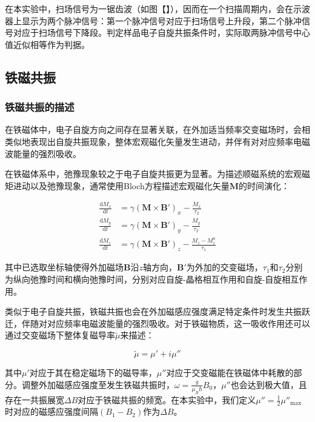 \documentclass{thuemp}
\begin{document}
在本实验中，扫场信号为一锯齿波（如图【】），因而在一个扫描周期内，会在示波器上显示为两个脉冲信号：第一个脉冲信号对应于扫场信号上升段，第二个脉冲信号对应于扫场信号下降段。判定样品电子自旋共振条件时，实际取两脉冲信号中心值近似相等作为判据。

\subsection{铁磁共振}

\subsubsection{铁磁共振的描述}

在铁磁体中，电子自旋方向之间存在显著关联，在外加适当频率交变磁场时，会相类似地表现出自旋共振现象，整体宏观磁化矢量发生进动，并伴有对对应频率电磁波能量的强烈吸收。

在铁磁体系中，弛豫现象较之于电子自旋共振更为显著。为描述顺磁系统的宏观磁矩进动以及弛豫现象，通常使用Bloch方程描述宏观磁化矢量$\symbf{M}$的时间演化：

\begin{equation}
\begin{aligned}
    \frac{\mathrm{d} M_x}{\mathrm{d} t} &= \gamma (\symbf{M} \times \symbf{B'})_x - \frac{M_x}{\tau_2} \\
    \frac{\mathrm{d} M_y}{\mathrm{d} t} &= \gamma (\symbf{M} \times \symbf{B'})_y - \frac{M_y}{\tau_2} \\
    \frac{\mathrm{d} M_z}{\mathrm{d} t} &= \gamma (\symbf{M} \times \symbf{B'})_z - \frac{M_z - M_z^0}{\tau_1}
\end{aligned}
\end{equation}

其中已选取坐标轴使得外加磁场$\mathbf{B}$沿$z$轴方向，$\symbf{B'}$为外加的交变磁场，$\tau_1$和$\tau_2$分别为纵向弛豫时间和横向弛豫时间，分别对应自旋-晶格相互作用和自旋-自旋相互作用。

类似于电子自旋共振，铁磁共振也会在外加磁感应强度满足特定条件时发生共振跃迁，伴随对对应频率电磁波能量的强烈吸收。对于铁磁物质，这一吸收作用还可以通过交变磁场下整体复磁导率$\tilde\mu $来描述：

\begin{equation}
    \tilde\mu = \mu' + i\mu''
\end{equation}

其中$\mu'$对应于其在稳定磁场下的磁导率，$\mu''$对应于交变磁能在铁磁体中耗散的部分。调整外加磁感应强度至发生铁磁共振时，$\omega = \frac{g}{\mu_B\hbar} B_0$，$\mu''$也会达到极大值，且存在一共振展宽$\Delta B$对应于铁磁共振的频宽。在本实验中，我们定义$\mu'' = \frac 1 2 \mu''_{\mathrm{max}}$时对应的磁感应强度间隔$(B_1 - B_2)$作为$\Delta B$。
\end{document}
